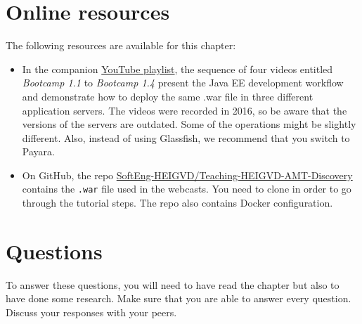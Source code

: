 \section{Online resources}

The following resources are available for this chapter:

\begin{itemize}
\item In the companion \href{https://www.youtube.com/playlist?list=PLfKkysTy70QaWqP7sD6xiqFvLZemVLQw_}{YouTube playlist}, the sequence of four videos entitled \emph{Bootcamp 1.1} to \emph{Bootcamp 1.4} present the Java EE development workflow and demonstrate how to deploy the same .war file in three different application servers. The videos were recorded in 2016, so be aware that the versions of the servers are outdated. Some of the operations might be slightly different. Also, instead of using Glassfish, we recommend that you switch to Payara.
\item On GitHub, the repo \href{https://github.com/SoftEng-HEIGVD/Teaching-HEIGVD-AMT-Discovery}{SoftEng-HEIGVD/Teaching-HEIGVD-AMT-Discovery} contains the \texttt{.war} file used in the webcasts. You need to clone in order to go through the tutorial steps. The repo also contains Docker configuration.
\end{itemize}



\section{Questions}

To answer these questions, you will need to have read the chapter but also to have done some research. Make sure that you are able to answer every question. Discuss your responses with your peers.


